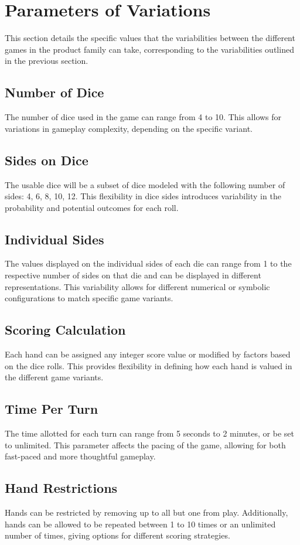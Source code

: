 \section{Parameters of Variations}

This section details the specific values that the variabilities between the different games in the product family can take, corresponding to the variabilities outlined in the previous section.

\subsection{Number of Dice}
The number of dice used in the game can range from 4 to 10. This allows for variations in gameplay complexity, depending on the specific variant.

\subsection{Sides on Dice}
The usable dice will be a subset of dice modeled with the following number of sides: 4, 6, 8, 10, 12. This flexibility in dice sides introduces variability in the probability and potential outcomes for each roll.

\subsection{Individual Sides}
The values displayed on the individual sides of each die can range from 1 to the respective number of sides on that die and can be displayed in different representations. This variability allows for different numerical or symbolic configurations to match specific game variants.

\subsection{Scoring Calculation}
Each hand can be assigned any integer score value or modified by factors based on the dice rolls. This provides flexibility in defining how each hand is valued in the different game variants.

\subsection{Time Per Turn}
The time allotted for each turn can range from 5 seconds to 2 minutes, or be set to unlimited. This parameter affects the pacing of the game, allowing for both fast-paced and more thoughtful gameplay.

\subsection{Hand Restrictions}
Hands can be restricted by removing up to all but one from play. Additionally, hands can be allowed to be repeated between 1 to 10 times or an unlimited number of times, giving options for different scoring strategies.

